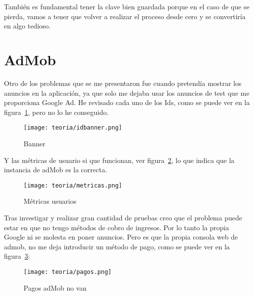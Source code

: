También es fundamental tener la clave bien guardada porque en el caso de que se pierda, vamos a tener que volver a realizar el proceso desde cero y se convertiría en algo tedioso.

\section{AdMob}
Otro de los problemas que se me presentaron fue cuando pretendía mostrar los anuncios en la aplicación, ya que solo me dejaba usar los anuncios de test que me proporciona Google Ad. He revisado cada uno de los Ids, como se puede ver en la figura~\ref{fig:idbanner}, pero no lo he conseguido.

\begin{figure}%
	\centering
	\texttt{[image: teoria/idbanner.png]}
	\caption{Banner}\label{fig:idbanner}
\end{figure}

Y las métricas de usuario si que funcionan, ver figura~\ref{fig:metricas}, lo que indica que la instancia de adMob es la correcta.

\begin{figure}%
	\centering
	\texttt{[image: teoria/metricas.png]}
	\caption{Métricas usuarios}\label{fig:metricas}
\end{figure}

Tras investigar y realizar gran cantidad de pruebas creo que el problema puede estar en que no tengo métodos de cobro de ingresos. Por lo tanto la propia Google ni se molesta en poner anuncios. Pero es que la propia consola web de admob, no me deja introducir un método de pago, como se puede ver en la figura~\ref{fig:pagos}:

\begin{figure}%
	\centering
	\texttt{[image: teoria/pagos.png]}
	\caption{Pagos adMob no van}\label{fig:pagos}
\end{figure}




